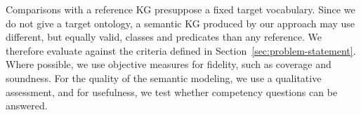 Comparisons with a reference KG presuppose a fixed target vocabulary. Since we do not give a target ontology, a semantic KG produced by our approach may use different, but equally valid, classes and predicates than any reference. We therefore evaluate against the criteria defined in Section~\ref{sec:problem-statement}. Where possible, we use objective measures for fidelity, such as coverage and soundness. For the quality of the semantic modeling, we use a qualitative assessment, and for usefulness, we test whether competency questions can be answered.


